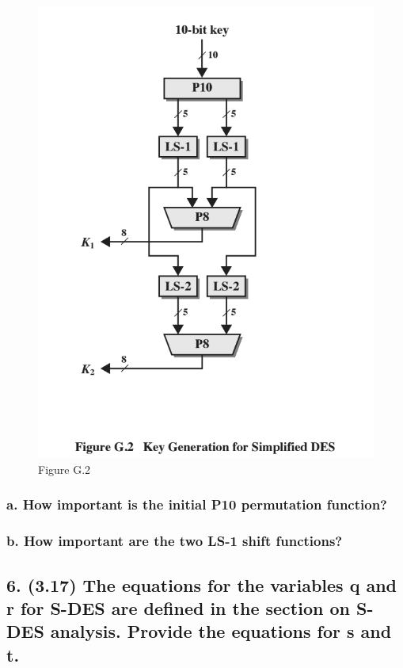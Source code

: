 \documentclass[12pt]{article}
\begin{document}
\begin{figure}[h]
  \includegraphics[width=\linewidth]{g2}
  \caption{Figure G.2}
\end{figure}

\subsubsection*{a. How important is the initial P10 permutation function?}
\subsubsection*{b. How important are the two LS-1 shift functions?}

\subsection*{6. (3.17) The equations for the variables q and r for S-DES are
defined in the section on S-DES analysis. Provide the equations for s and t.}
\end{document}

